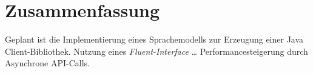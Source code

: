 \chapter{Zusammenfassung}
\label{chap:summary}



\label{sec:conclusion}




\label{sec:prospect}

Geplant ist die Implementierung eines Sprachemodells zur Erzeugung einer Java Client-Bibliothek.
Nutzung eines \emph{Fluent-Interface} \ldots
Performancesteigerung durch Asynchrone API-Calls.
